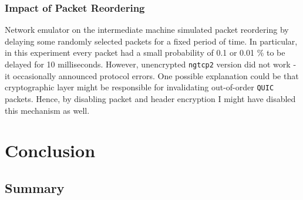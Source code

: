 \documentclass[12pt,a4paper]{report}
\newcommand\note[2]{{\color{#1}\bf #2}}
\newcommand\simon[1]{\ifcomments{\note{cyan}{SM: #1}}\fi}
\begin{document}
\subsection{Impact of Packet Reordering}
Network emulator on the intermediate machine simulated packet reordering by delaying some randomly selected packets for a fixed period of time. 
In particular, in this experiment every packet had a small probability of 0.1 or 0.01 \% to be delayed for 10 milliseconds.
However, unencrypted \texttt{ngtcp2} version did not work - it occasionally announced protocol errors.
One possible explanation could be that cryptographic layer might be responsible for invalidating out-of-order \texttt{QUIC} packets.
Hence, by disabling packet and header encryption I might have disabled this mechanism as well.








\chapter{Conclusion}



\section{Summary}
\end{document}
